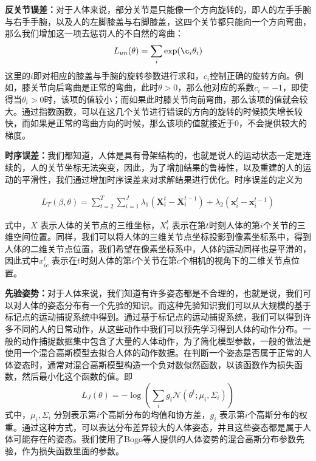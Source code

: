 \textbf{反关节误差：}对于人体来说，部分关节是只能像一个方向旋转的，即人的左手手腕与右手手腕，以及人的左脚膝盖与右脚膝盖，这四个关节都只能向一个方向弯曲，那么我们增加这一项去惩罚人的不自然的弯曲：
\begin{equation}
    L_{un}(\theta) = \sum_i \exp(\c_i\theta_i)
\end{equation}
这里的\(i\)即对相应的膝盖与手腕的旋转参数进行求和，\(c_i\)控制正确的旋转方向。例如，膝关节向后弯曲是正常的弯曲，此时\(\theta>0\)，那么他对应的系数\(c_i = -1\)，即使得当\(\theta_i>0\)时，该项的值较小；而如果此时膝关节向前弯曲，那么该项的值就会较大。通过指数函数，可以在这几个关节进行错误的方向的旋转的时候损失增长较快，而如果是正常的弯曲方向的时候，那么该项的值就接近于0，不会提供较大的梯度。

\textbf{时序误差：}我们都知道，人体是具有骨架结构的，也就是说人的运动状态一定是连续的，人的关节坐标无法突变，因此，为了增加结果的鲁棒性，以及重建的人的运动的平滑性，我们通过增加时序误差来对求解结果进行优化。时序误差的定义为

\begin{align} 
    L_ { T } ( \beta , \theta ) = \sum _ { t = 2 } ^ { T } \sum _ { i = 1 } ^ { J } \lambda _ { 1 } \left( \mathbf { X } _ { i } ^ { t } - \mathbf { X } _ { i } ^ { t - 1 } \right) + \lambda _ { 2 }\left( \mathbf { x } _ { i } ^ { t } - \mathbf { x } _ { i } ^ { t - 1 } \right)
\end{align}

式中，$X$ 表示人体的关节点的三维坐标，$X_i^t$ 表示在第$t$时刻人体的第$i$个关节的三维空间位置。同样，我们可以将人体的三维关节点坐标投影到像素坐标系中，得到人体的二维关节点位置，我们希望在像素坐标系中，人体的运动同样也是平滑的，因此式中$x_{ic}^t$ 表示在$t$时刻人体的第$i$个关节在第$c$个相机的视角下的二维关节点位置。
 
\textbf{先验姿势：}对于人体来说，我们知道有许多姿态都是不合理的，也就是说，我们可以对人体的姿态分布有一个先验的知识。而这种先验知识我们可以从大规模的基于标记点的运动捕捉系统中得到。通过基于标记点的运动捕捉系统，我们可以得到许多不同的人的日常动作，从这些动作中我们可以预先学习得到人体的动作分布。一般的动作捕捉数据集中包含了大量的人体动作，为了简化模型参数，一般的做法是使用一个混合高斯模型去拟合人体的动作数据。在判断一个姿态是否属于正常的人体姿态时，通常对混合高斯模型构造一个负对数似然函数，以该函数作为损失函数，然后最小化这个函数的值。即%
$$
    L_ { J } ( \theta ) = - \log \left( \sum _ { i } g _ { i } \mathcal { N } \left( \theta ^ { t } ; \mu _ { i } , \Sigma _ { i } \right) \right)
$$
式中，$\mu_i, \Sigma_i$ 分别表示第$i$个高斯分布的均值和协方差，$g_i$ 表示第$i$个高斯分布的权重。通过这种方式，可以表达分布差异较大的人体姿态，并且这些姿态都是属于人体可能存在的姿态。我们使用了Bogo\cite{bogo2016keep}等人提供的人体姿势的混合高斯分布参数先验，作为损失函数里面的参数。

